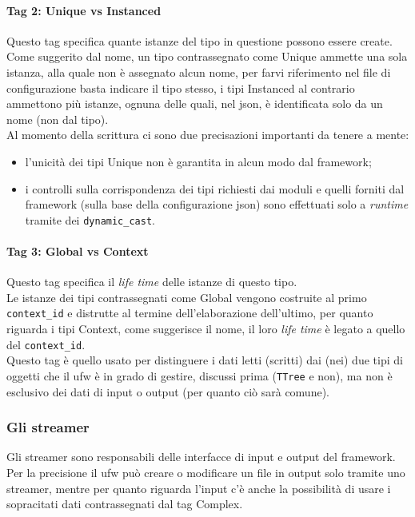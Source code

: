 \documentclass[../../main.tex]{subfiles}
\begin{document}
    \paragraph{Tag 2: Unique vs Instanced}
      Questo tag specifica quante istanze del tipo in questione possono
      essere create.\\
      Come suggerito dal nome, un tipo contrassegnato come Unique ammette
      una sola istanza, alla quale non è assegnato alcun nome, per farvi
      riferimento nel file di configurazione basta indicare il tipo stesso,
      i tipi Instanced al contrario ammettono più istanze, ognuna delle
      quali, nel json, è identificata solo da un nome (non dal tipo).\\
      Al momento della scrittura ci sono due precisazioni importanti da
      tenere a mente:
    \begin{itemize}
      \item l'unicità dei tipi Unique non è garantita in alcun modo dal
      framework;
      \item i controlli sulla corrispondenza dei tipi richiesti dai moduli
      e quelli forniti dal framework (sulla base della configurazione
      json) sono effettuati solo a \textit{runtime} tramite dei
      \texttt{dynamic\_cast}.
      \end{itemize}

    \paragraph{Tag 3: Global vs Context}
      Questo tag specifica il \textit{life time} delle istanze di questo
      tipo.\\
      Le istanze dei tipi contrassegnati come Global vengono costruite al primo
      \texttt{context\_id} e distrutte al termine dell'elaborazione
      dell'ultimo, per quanto riguarda i tipi Context, come suggerisce il
      nome, il loro \textit{life time} è legato a quello del
      \texttt{context\_id}.\\
      Questo tag è quello usato per distinguere i dati letti (scritti) dai
      (nei) due tipi di oggetti che il ufw è in grado di gestire, discussi prima
      (\texttt{TTree} e non), ma non è esclusivo dei dati di input o output
      (per quanto ciò sarà comune).

  \subsubsection*{Gli streamer}
    Gli streamer sono responsabili delle interfacce di input e output del
    framework.
    Per la precisione il ufw può creare o modificare un file in output solo
    tramite uno streamer, mentre per quanto riguarda l'input c'è anche la
    possibilità di usare i sopracitati dati contrassegnati dal tag Complex.
\end{document}
